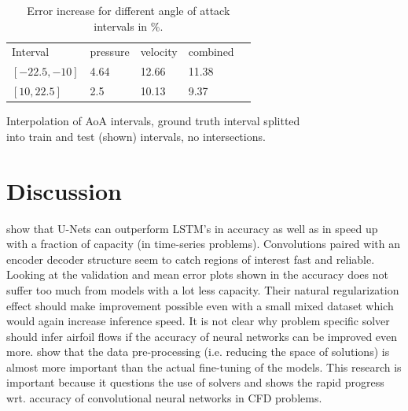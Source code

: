 \documentclass[acmtog]{techreportacmart}
\begin{document}
\begin{table}
\caption{Error increase for different angle of attack intervals in \%.}
\label{tab:gen2}
\begin{center}
\begin{tabular}{l|l|l|l|l}
  \toprule
  Interval   	& pressure   &	velocity    & combined \\
  $[-22.5, -10]$ 	& 4.64	  & 12.66		& 11.38	   \\
  $[10, 22.5]$	 	& 2.5	  & 10.13		& 9.37	   \\
  \bottomrule
\end{tabular}
\end{center}
\bigskip\centering
\footnotesize Interpolation of AoA intervals, ground truth interval splitted \\
	into train and test (shown) intervals, no intersections.  
\end{table}%



\section{Discussion}
\cite{Fotiadis2020} show that U-Nets can outperform LSTM's in accuracy as well as in speed 
up with a fraction of capacity (in time-series problems). Convolutions paired with an encoder 
decoder structure seem to catch regions of interest fast and reliable. Looking at the validation 
and mean error plots shown in \cite{Thuerey20} the accuracy does not suffer too much from models 
with a lot less capacity. Their natural regularization effect should make improvement possible 
even with a small mixed dataset which would again increase inference speed. It is not clear 
why problem specific solver should infer airfoil flows if the accuracy of neural networks 
can be improved even more. \cite{Thuerey20} show that the data pre-processing (i.e. reducing 
the space of solutions) is almost more important than the actual fine-tuning of the models. 
This research is important because it questions the use of solvers and shows the rapid progress 
wrt. accuracy of convolutional neural networks in CFD problems.
\end{document}
